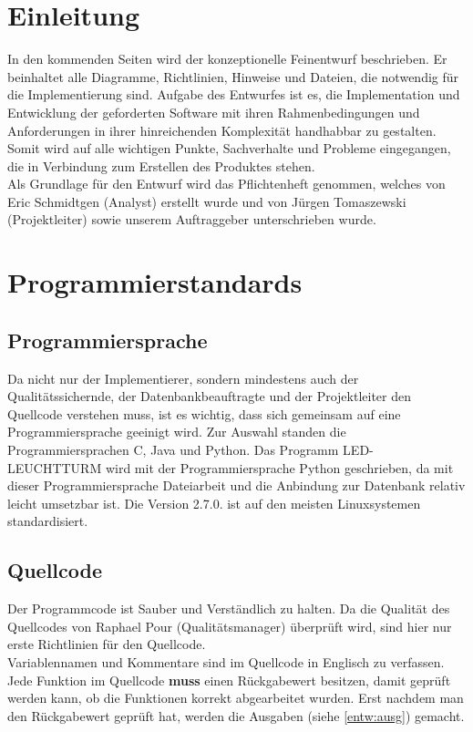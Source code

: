 \documentclass{scrartcl}
\begin{document}
\maketitle
\section{Einleitung}
	In den kommenden Seiten wird der konzeptionelle Feinentwurf beschrieben. Er beinhaltet alle Diagramme, Richtlinien, Hinweise und Dateien, die notwendig für die Implementierung sind. Aufgabe des Entwurfes ist es, die Implementation und Entwicklung der geforderten Software mit ihren Rahmenbedingungen und Anforderungen in ihrer hinreichenden Komplexität handhabbar zu gestalten. Somit wird auf alle wichtigen Punkte, Sachverhalte und Probleme eingegangen, die in Verbindung zum Erstellen des Produktes stehen.\\ Als Grundlage für den Entwurf wird das Pflichtenheft genommen, welches von Eric Schmidtgen (Analyst) erstellt wurde und von Jürgen Tomaszewski (Projektleiter) sowie unserem Auftraggeber unterschrieben wurde. 
\section{Programmierstandards}	
\subsection{Programmiersprache}	
	Da nicht nur der Implementierer, sondern mindestens auch der Qualitätssichernde, der Datenbankbeauftragte und der Projektleiter den Quellcode verstehen muss, ist es wichtig, dass sich gemeinsam auf eine Programmiersprache geeinigt wird. Zur Auswahl standen die Programmiersprachen C, Java und Python. Das Programm LED-LEUCHTTURM wird mit der Programmiersprache Python geschrieben, da mit dieser Programmiersprache Dateiarbeit und die Anbindung zur Datenbank relativ leicht umsetzbar ist. Die Version 2.7.0. ist auf den meisten Linuxsystemen standardisiert. 
\subsection{Quellcode}
	Der Programmcode ist Sauber und Verständlich zu halten. Da die Qualität des Quellcodes von Raphael Pour (Qualitätsmanager) überprüft wird, sind hier nur erste Richtlinien für den Quellcode.\\
	Variablennamen und Kommentare sind im Quellcode in Englisch zu verfassen. Jede Funktion im Quellcode \textbf{muss} einen Rückgabewert besitzen, damit geprüft werden kann, ob die Funktionen korrekt abgearbeitet wurden. Erst nachdem man den Rückgabewert geprüft hat, werden die Ausgaben (siehe \autoref{entw:ausg}) gemacht.
	
\end{document}
